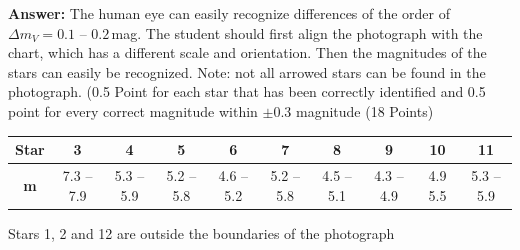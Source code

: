 \textbf{Answer:} The human eye can easily recognize differences of the order
of $\Delta m_V = 0.1$ -- $0.2$\,mag. The student should first align the
photograph with the chart, which has a different scale and orientation. Then
the magnitudes of the stars can easily be recognized. Note: not all arrowed
stars can be found in the photograph. (0.5 Point for each star that has been
correctly identified and 0.5 point for every correct magnitude within
$\pm0.3$ magnitude \hfill(18 Points)

\begin{center}
\begin{tabular}{|c|c|c|c|c|c|c|c|c|c|}
\hline
\textbf{Star} & 3 & 4 & 5 & 6 & 7 & 8 & 9 & 10 & 11\\
\hline
\textbf{m} & 7.3 -- 7.9 & 5.3 -- 5.9 & 5.2 -- 5.8 & 4.6 -- 5.2
  & 5.2 -- 5.8 & 4.5 -- 5.1 & 4.3 -- 4.9 & 4.9 5.5 %
  & 5.3 -- 5.9\\
\hline
\end{tabular}
\end{center}

Stars 1, 2 and 12 are outside the boundaries of the photograph


